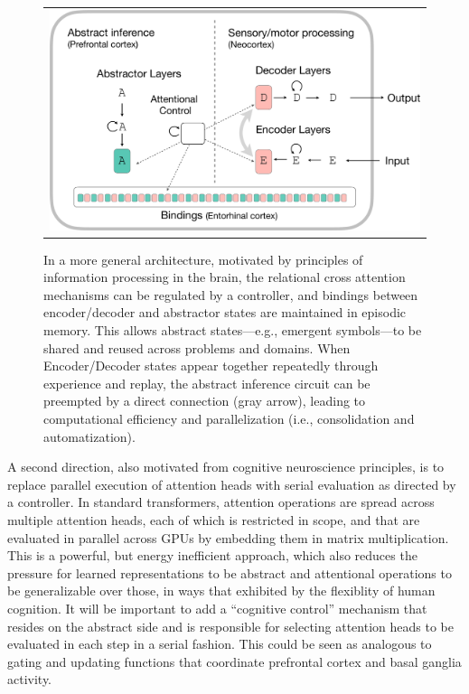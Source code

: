 \begin{figure}[t]
    \vspace{-3mm}
    \begin{center}
    \begin{tabular}{c}
        \hskip2pt\includegraphics[width=.60\textwidth]{figures/algorithm-diagram2-crop} 
    \end{tabular}
    \caption{In a more general architecture, motivated by principles of information processing 
    in the brain, the relational cross attention mechanisms can be regulated by a controller, and bindings between encoder/decoder and abstractor states are maintained in episodic memory. This allows abstract states---e.g., emergent symbols---to be shared and reused across problems and domains. When Encoder/Decoder states appear together repeatedly through experience and replay, the abstract inference circuit can be preempted by a direct connection (gray arrow), leading to computational efficiency and parallelization (i.e., consolidation and automatization).
    }
    \label{fig:algo2}
    \vskip-12pt
    \end{center}
\end{figure}

A second direction, also motivated from cognitive neuroscience principles, is to replace 
parallel execution of attention heads with serial evaluation as directed by a controller. 
In standard transformers, attention operations are spread across multiple attention heads,
each of which is restricted in scope, and that are evaluated in parallel across GPUs by embedding them in matrix multiplication. This is a powerful, but energy inefficient approach, which also reduces the pressure for learned representations to be abstract and attentional operations to be generalizable over those, in ways that exhibited by the flexiblity of human cognition.  It will be important to add a ``cognitive control'' mechanism that resides on the abstract side and is responsible for selecting attention heads to be evaluated in each step in a serial fashion. This could be seen as analogous to gating and updating functions that coordinate prefrontal cortex and basal ganglia activity.

